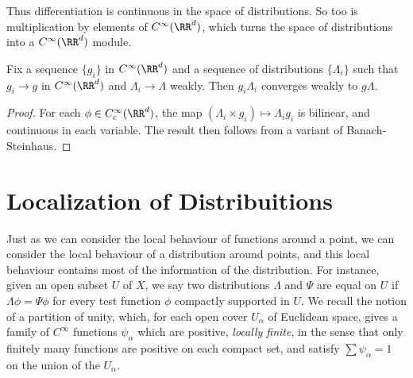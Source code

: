 Thus differentiation is continuous in the space of distributions. So too is multiplication by elements of $C^\infty(\RR^d)$, which turns the space of distributions into a $C^\infty(\RR^d)$ module.

\begin{theorem}
  Fix a sequence $\{ g_i \}$ in $C^\infty(\RR^d)$ and a sequence of distributions $\{ \Lambda_i \}$ such that $g_i \to g$ in $C^\infty(\RR^d)$ and $\Lambda_i \to \Lambda$ weakly. Then $g_i \Lambda_i$ converges weakly to $g \Lambda$.
\end{theorem}
\begin{proof}
  For each $\phi \in C_c^\infty(\RR^d)$, the map $(\Lambda_i \times g_i) \mapsto \Lambda_i g_i$ is bilinear, and continuous in each variable. The result then follows from a variant of Banach-Steinhaus.
\end{proof}

\section{Localization of Distribuitions}

Just as we can consider the local behaviour of functions around a point, we can consider the local behaviour of a distribution around points, and this local behaviour contains most of the information of the distribution. For instance, given an open subset $U$ of $X$, we say two distributions $\Lambda$ and $\Psi$ are equal on $U$ if $\Lambda \phi = \Psi \phi$ for every test function $\phi$ compactly supported in $U$. We recall the notion of a partition of unity, which, for each open cover $U_\alpha$ of Euclidean space, gives a family of $C^\infty$ functions $\psi_\alpha$ which are positive, {\it locally finite}, in the sense that only finitely many functions are positive on each compact set, and satisfy $\sum \psi_\alpha = 1$ on the union of the $U_\alpha$.

